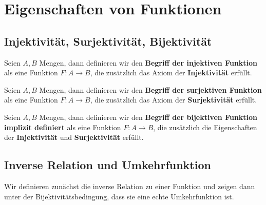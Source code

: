 \documentclass[main.tex]{subfiles}
\begin{document}
%
{
}


\section{Eigenschaften von Funktionen}
\subsection{Injektivität, Surjektivität, Bijektivität}

\begin{definition}
Seien \(A,B\) Mengen, dann definieren wir den \textbf{Begriff der injektiven Funktion} als eine Funktion \(F\colon A\to B\), die zusätzlich das Axiom der \textbf{Injektivität} erfüllt.
\end{definition}

%
{
}

\begin{definition}
Seien \(A,B\) Mengen, dann definieren wir den \textbf{Begriff der surjektiven Funktion} als eine Funktion \(F\colon A\to B\), die zusätzlich das Axiom der \textbf{Surjektivität} erfüllt.
\end{definition}

{
}


\begin{definition}
Seien \(A,B\) Mengen, dann definieren wir den \textbf{Begriff der bijektiven Funktion} \textbf{implizit definiert} als eine Funktion \(F\colon A\to B\), die zusätzlich die Eigenschaften der \textbf{Injektivität} und \textbf{Surjektivität} erfüllt.
\end{definition}

\subsection{Inverse Relation und Umkehrfunktion}

Wir definieren zunächst die inverse Relation zu einer Funktion und zeigen dann unter der Bijektivitätsbedingung, dass sie eine echte Umkehrfunktion ist.
\end{document}
